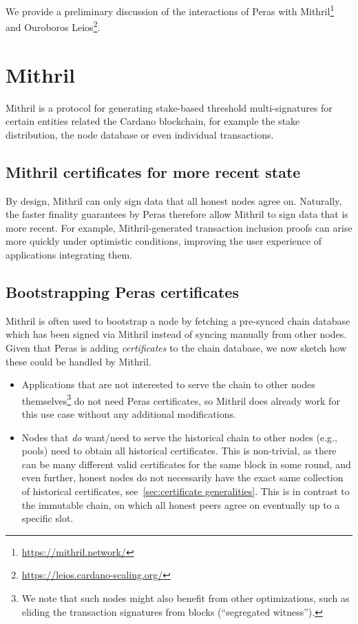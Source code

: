 We provide a preliminary discussion of the interactions of Peras with Mithril\footnote{\label{footnote:mithril}\url{https://mithril.network/}} and Ouroboros Leios\footnote{\label{footnote:leios}\url{https://leios.cardano-scaling.org/}}.

\section{Mithril}\label{sec:mithril}

Mithril is a protocol for generating stake-based threshold multi-signatures for certain entities related the Cardano blockchain, for example the stake distribution, the node database or even individual transactions.

\subsection{Mithril certificates for more recent state}

By design, Mithril can only sign data that all honest nodes agree on.
Naturally, the faster finality guarantees by Peras therefore allow Mithril to sign data that is more recent.
For example, Mithril-generated transaction inclusion proofs can arise more quickly under optimistic conditions, improving the user experience of applications integrating them.

\subsection{Bootstrapping Peras certificates}
Mithril is often used to bootstrap a node by fetching a pre-synced chain database which has been signed via Mithril instead of syncing manually from other nodes.
Given that Peras is adding \emph{certificates} to the chain database, we now sketch how these could be handled by Mithril.
\begin{itemize}
\item
  Applications that are not interested to serve the chain to other nodes themselves\footnote{
    We note that such nodes might also benefit from other optimizations, such as eliding the transaction signatures from blocks (\enquote{segregated witness}).}
  do not need Peras certificates, so Mithril does already work for this use case without any additional modifications.
\item
  Nodes that \emph{do} want/need to serve the historical chain to other nodes (e.g., pools) need to obtain all historical certificates.
  This is non-trivial, as there can be many different valid certificates for the same block in some round, and even further, honest nodes do not necessarily have the exact same collection of historical certificates, see~\cref{sec:certificate generalities}.
  This is in contrast to the immutable chain, on which all honest peers agree on eventually up to a specific slot.
\end{itemize}

